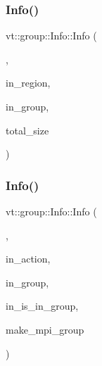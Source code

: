 \mbox{\label{structvt_1_1group_1_1_info_a8439da4014d2ab7dcc5549b8ed2f9675}} 
\subsubsection{\texorpdfstring{Info()}{Info()}\hspace{0.1cm}{\footnotesize\ttfamily [4/5]}}
{\footnotesize\ttfamily vt\+::group\+::\+Info\+::\+Info (\begin{DoxyParamCaption}\item[{Info\+Rooted\+Remote\+Cons\+Type}]{,  }\item[{\hyperlink{structvt_1_1group_1_1_info_rooted_a127ac5ebcfb9871621c1f66dba481c0b}{Region\+Ptr\+Type}}]{in\+\_\+region,  }\item[{\hyperlink{namespacevt_a27b5e4411c9b6140c49100e050e2f743}{Group\+Type} const}]{in\+\_\+group,  }\item[{\hyperlink{structvt_1_1group_1_1region_1_1_region_a9bb381adf31111aae34dbc644bad6c1f}{Region\+Type\+::\+Size\+Type} const \&}]{total\+\_\+size }\end{DoxyParamCaption})}

\mbox{\label{structvt_1_1group_1_1_info_a87a6ef1f2feb855de0ba58d87471ecb8}} 
\subsubsection{\texorpdfstring{Info()}{Info()}\hspace{0.1cm}{\footnotesize\ttfamily [5/5]}}
{\footnotesize\ttfamily vt\+::group\+::\+Info\+::\+Info (\begin{DoxyParamCaption}\item[{Info\+Collective\+Cons\+Type}]{,  }\item[{\hyperlink{namespacevt_ae0a5a7b18cc99d7b732cb4d44f46b0f3}{Action\+Type}}]{in\+\_\+action,  }\item[{\hyperlink{namespacevt_a27b5e4411c9b6140c49100e050e2f743}{Group\+Type} const}]{in\+\_\+group,  }\item[{bool const}]{in\+\_\+is\+\_\+in\+\_\+group,  }\item[{bool}]{make\+\_\+mpi\+\_\+group }\end{DoxyParamCaption})}

